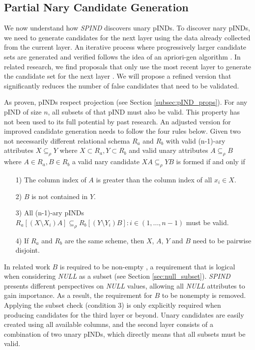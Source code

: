 \subsection{Partial Nary Candidate Generation}\label{sec:candidate_gen}
We now understand how \textit{SPIND} discovers unary pINDs. To discover nary pINDs, we need to generate candidates for the next layer using the data already collected from the current layer. An iterative process where progressively larger candidate sets are generated and verified follows the idea of an apriori-gen algorithm \cite{agrawal1994fast}. In related research, we find proposals that only use the most recent layer to generate the candidate set for the next layer \cite{papenbrock2015divide}. We will propose a refined version that significantly reduces the number of false candidates that need to be validated.

As proven, pINDs respect projection (see Section \ref{subsec:pIND_props}). For any pIND of size $n$, all subsets of that pIND must also be valid. This property has not been used to its full potential by past research. An adjusted version for improved candidate generation needs to follow the four rules below. Given two not necessarily different relational schema $R_a$ and $R_b$ with valid (n-1)-ary attributes $X \subseteq_\rho Y$ where $X \subset R_a, Y \subset R_b$ and valid unary attributes $A \subseteq_\rho B$ where $A \in R_a, B \in R_b$ a valid nary candidate $XA \subseteq_\rho YB$ is formed if and only if
\begin{itemize}
    \item[1)] The column index of $A$ is greater than the column index of all $x_i \in X$.
    \item[2)] $B$ is not contained in $Y$.
    \item[3)] All (n-1)-ary pINDs $R_a[(X \setminus X_i)A] \subseteq_\rho R_b[(Y \setminus Y_i)B] : i \in (1, \dots, n-1)$ must be valid.
    \item[4)] If $R_a$ and $R_b$ are the same scheme, then $X$, $A$, $Y$ and $B$ need to be pairwise disjoint.
\end{itemize}

In related work $B$ is required to be non-empty \cite{papenbrock2015divide}, a requirement that is logical when considering \textit{NULL} as a subset (see Section \ref{sec:null_subset}). \textit{SPIND} presents different perspectives on \textit{NULL} values, allowing all \textit{NULL} attributes to gain importance. As a result, the requirement for $B$ to be nonempty is removed. Applying the subset check (condition 3) is only explicitly required when producing candidates for the third layer or beyond. Unary candidates are easily created using all available columns, and the second layer consists of a combination of two unary pINDs, which directly means that all subsets must be valid.


